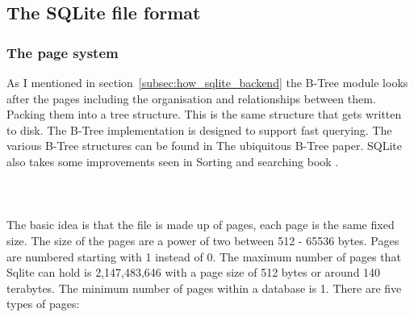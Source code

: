 \subsection{The SQLite file format}
\label{subsec:sqlite_file_format}

\subsubsection{The page system}
\label{subsubsec:sqlite_page_system}

As I mentioned in section~\ref{subsec:how_sqlite_backend} the B-Tree module looks after the pages including the organisation and relationships between them. Packing them into a tree structure. This is the same structure that gets written to disk. The B-Tree implementation is designed to support fast querying. The various B-Tree structures can be found in \cite{btreepaper} The ubiquitous B-Tree paper. SQLite also takes some improvements seen in \cite{btreeimprpaper} Sorting and searching book \citep{sqliteray}.
\\\\\\\\
The basic idea is that the file is made up of pages, each page is the same fixed size. The size of the pages are a power of two between 512 - 65536 bytes. Pages are numbered starting with 1 instead of 0. The maximum number of pages that Sqlite can hold is 2,147,483,646 with a page size of 512 bytes or around 140 terabytes. The minimum number of pages within a database is 1. There are five types of pages:


